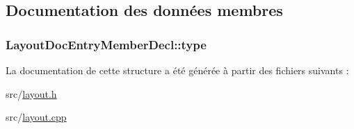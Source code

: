 \subsection{Documentation des données membres}
\hypertarget{struct_layout_doc_entry_member_decl_a9a03c58c4e1d6e007eabd27834106db4}{}
\subsubsection[{type}]{ Layout\+Doc\+Entry\+Member\+Decl\+::type}\label{struct_layout_doc_entry_member_decl_a9a03c58c4e1d6e007eabd27834106db4}


La documentation de cette structure a été générée à partir des fichiers suivants \+:\begin{DoxyCompactItemize}
\item 
src/\hyperlink{layout_8h}{layout.\+h}\item 
src/\hyperlink{layout_8cpp}{layout.\+cpp}\end{DoxyCompactItemize}
